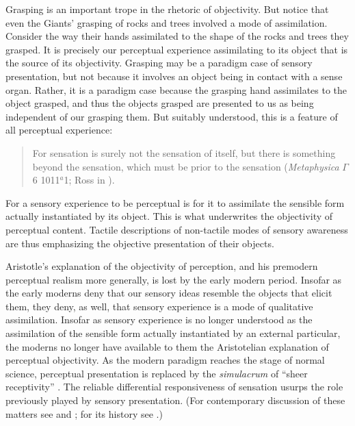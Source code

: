 Grasping is an important trope in the rhetoric of objectivity. But notice that even the Giants' grasping of rocks and trees involved a mode of assimilation. Consider the way their hands assimilated to the shape of the rocks and trees they grasped. It is precisely our perceptual experience assimilating to its object that is the source of its objectivity.  Grasping may be a paradigm case of sensory presentation, but not because it involves an object being in contact with a sense organ. Rather, it is a paradigm case because the grasping hand assimilates to the object grasped, and thus the objects grasped are presented to us as being independent of our grasping them. But suitably understood, this is a feature of all perceptual experience:
\begin{quote}
	For sensation is surely not the sensation of itself, but there is something beyond the sensation, which must be prior to the sensation (\emph{Metaphysica} \( \Gamma \) 6 1011\( ^{a} \)1; Ross in \citealt[56]{Barnes:1984kx}).
\end{quote}
For a sensory experience to be perceptual is for it to assimilate the sensible form actually instantiated by its object. This is what underwrites the objectivity of perceptual content. Tactile descriptions of non-tactile modes of sensory awareness are thus emphasizing the objective presentation of their objects.

Aristotle's explanation of the objectivity of perception, and his premodern perceptual realism more generally, is lost by the early modern period. Insofar as the early moderns deny that our sensory ideas resemble the objects that elicit them, they deny, as well, that sensory experience is a mode of qualitative assimilation. Insofar as sensory experience is no longer understood as the assimilation of the sensible form actually instantiated by an external particular, the moderns no longer have available to them the Aristotelian explanation of perceptual objectivity. As the modern paradigm reaches the stage of normal science, perceptual presentation is replaced by the \emph{simulacrum} of ``sheer receptivity'' \citep[16]{Sellars:1967uq}. The reliable differential responsiveness of sensation usurps the role previously played by sensory presentation. (For contemporary discussion of these matters see \citealt{McDowell:1998vn} and \citealt{Kalderon:2011fk}; for its history see \citealt{Hamlyn:1961ys}.)

